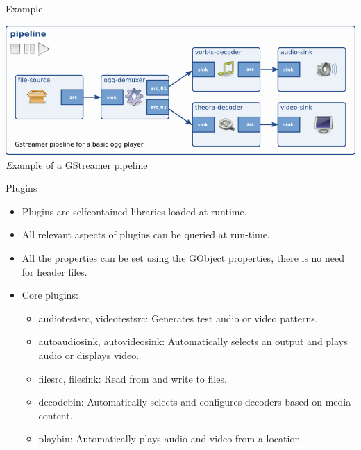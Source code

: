 \begin{frame}{Example}
  \begin{center}
    \includegraphics[width=\textwidth]{slides/audio-gstreamer/simple-player.png}\\
    {\textit Example of a GStreamer pipeline}
  \end{center}
\end{frame}

\begin{frame}{Plugins}
  \begin{itemize}
  \item Plugins are selfcontained libraries loaded at runtime.
  \item All relevant aspects of plugins can be queried at run-time.
  \item All the properties can be set using the GObject properties, there is no need for header files.
  \item Core plugins:
    \begin{itemize}
    \item audiotestsrc, videotestsrc: Generates test audio or video
      patterns.
    \item autoaudiosink, autovideosink: Automatically selects an
      output and plays audio or displays video.
    \item filesrc, filesink: Read from and write to files.
    \item decodebin: Automatically selects and configures decoders
      based on media content.
    \item playbin: Automatically plays audio and video from a location
    \end{itemize}
  \end{itemize}
\end{frame}


